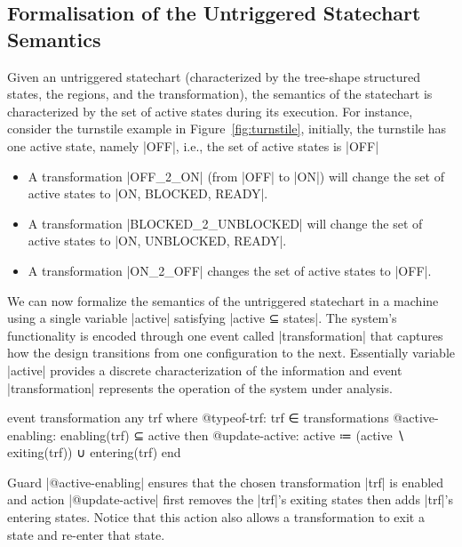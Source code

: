 \subsection{Formalisation of the Untriggered Statechart Semantics}
\label{sec:utsc-semantics}

Given an untriggered statechart (characterized by the tree-shape structured states, the regions, and the transformation), the semantics of the statechart is characterized by the set of active states during its execution. For instance, consider the turnstile example in Figure~\ref{fig:turnstile}, initially, the turnstile has one active state, namely |OFF|, i.e., the set of active states is |{OFF}|
\begin{itemize}
    \item A transformation |OFF_2_ON| (from |OFF| to |ON|) will change the set of active states to |{ON, BLOCKED, READY}|.
    \item A transformation |BLOCKED_2_UNBLOCKED| will change the set of active states to |{ON, UNBLOCKED, READY}|.
    \item A transformation |ON_2_OFF| changes the set of active states to |{OFF}|.
\end{itemize}

We can now formalize the semantics of the untriggered statechart in a machine using a single variable |active| satisfying |active ⊆ states|. 
The system's functionality is encoded through one event called |transformation| that captures how the design transitions from one configuration to the next. 
Essentially variable |active| provides a discrete characterization of the information and event |transformation| represents the operation of the system under analysis. 
\begin{EventBcode}
event transformation
any trf where
	@typeof-trf: trf ∈ transformations
	@active-enabling: enabling(trf) ⊆ active
then
	@update-active: active ≔ (active ∖ exiting(trf)) ∪ entering(trf)
end
\end{EventBcode}
Guard |@active-enabling| ensures that the chosen transformation |trf| is enabled and action |@update-active| first removes the |trf|'s exiting states then adds |trf|'s entering states.  Notice that this action also allows a transformation to exit a state and re-enter that state.

